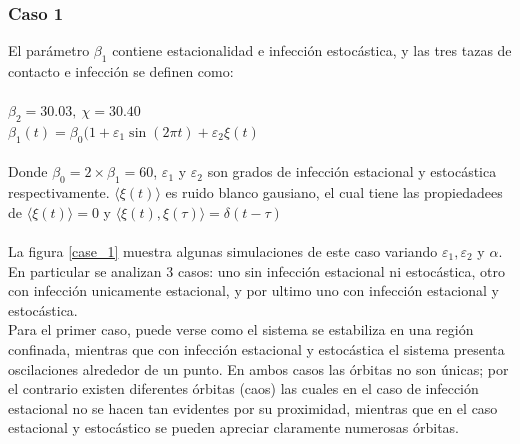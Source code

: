 \documentclass[conference]{IEEEtran}
\begin{document}
\subsubsection{Caso 1}

El parámetro $\beta_1$ contiene estacionalidad e infección estocástica, y las tres tazas de contacto e infección se definen como:
\\\\
$\beta_2 = 30.03, \ \chi = 30.40$
\\
$\beta_1(t) = \beta_0(1 + \varepsilon_1 \sin(2\pi t) + \varepsilon_2 \xi(t)$
\\\\
Donde $\beta_0 = 2 \times \beta_1 = 60$, $\varepsilon_1$ y $\varepsilon_2$ son grados de infección 
estacional y estocástica respectivamente. $\langle \xi(t) \rangle$ es ruido blanco gausiano, 
el cual tiene las propiedadees de $\langle \xi(t) \rangle = 0$ y $\langle \xi(t), \xi(\tau) \rangle = \delta(t - \tau)$
\\\\
La figura \ref{case_1} muestra algunas simulaciones de este caso variando $\varepsilon_1, \varepsilon_2$
y $\alpha$. En particular se analizan 3 casos: uno sin infección estacional ni estocástica, otro con infección
unicamente estacional, y por ultimo uno con infección estacional y estocástica. 
\\
Para el primer caso, puede verse como el sistema se estabiliza en una región confinada, mientras 
que con infección estacional y estocástica el sistema presenta oscilaciones alrededor de un punto. En ambos
casos las órbitas no son únicas; por el contrario existen diferentes órbitas (caos) las cuales en el caso 
de infección estacional no se hacen tan evidentes por su proximidad, mientras que en el caso estacional y
estocástico se pueden apreciar claramente numerosas órbitas.
\\\\
\end{document}
